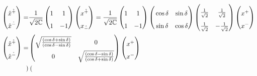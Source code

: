 \documentclass[]{article}
\numberwithin{equation}{section}
\begin{document}
{{\begin{align}
\begin{pmatrix}
   \rule{0pt}{16pt} \hat{x}^{\hat{+}}\\
    \rule{0pt}{16pt} \hat{x}^{\hat{-}}
  \end{pmatrix}=&
\frac{1}{\sqrt{2\mathbb{C}}}
  \begin{pmatrix}
     \rule{0pt}{16pt} 1&1\\
     \rule{0pt}{16pt} 1&-1
  \end{pmatrix}
  \begin{pmatrix}
   \rule{0pt}{16pt} x^{\hat{+}}\\
    \rule{0pt}{16pt} x_{\hat{-}}
  \end{pmatrix}=
  \frac{1}{\sqrt{2\mathbb{C}}}
  \begin{pmatrix}
     \rule{0pt}{16pt} 1&1\\
     \rule{0pt}{16pt} 1&-1
  \end{pmatrix}
  \begin{pmatrix}
    \rule{0pt}{16pt} \cos\delta  & \sin\delta \\
    \rule{0pt}{16pt} \sin\delta  & \cos\delta
  \end{pmatrix}
  \begin{pmatrix}
    \rule{0pt}{16pt} \frac{1}{\sqrt{2}}  & \frac{1}{\sqrt{2}} \\
    \rule{0pt}{16pt} \frac{1}{\sqrt{2}}  & -\frac{1}{\sqrt{2}}
  \end{pmatrix}
  \begin{pmatrix}
    \rule{0pt}{16pt} x^{+}\\
   \rule{0pt}{16pt} x^{-}
  \end{pmatrix}\\
   \begin{pmatrix}
   \rule{0pt}{16pt} \hat{x}^{\hat{+}}\\
    \rule{0pt}{16pt} \hat{x}^{\hat{-}}
  \end{pmatrix}=&
  \begin{pmatrix}
    \rule{0pt}{16pt} \sqrt{\frac{(\cos\delta+\sin\delta)}{(\cos\delta-\sin\delta)}}  & 0 \\
    \rule{0pt}{16pt} 0  & \sqrt{\frac{(\cos\delta-\sin\delta)}{(\cos\delta+\sin\delta)}} 
  \end{pmatrix}
  \begin{pmatrix}
    \rule{0pt}{16pt} x^{+}\\
   \rule{0pt}{16pt} x^{-}
  \end{pmatrix}\\
   \begin{pmatrix}

\end{pmatrix}
\end{align}}}
\end{document}
